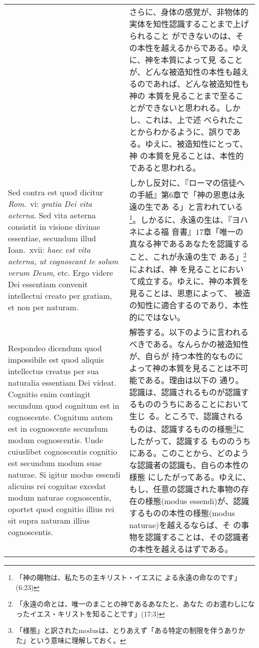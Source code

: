 \documentclass[10pt]{jsarticle} %
\begin{document}
\begin{longtable}{p{21em}p{21em}}
&

さらに、身体の感覚が、非物体的実体を知性認識することまで上げられること
ができないのは、その本性を越えるからである。ゆえに、神を本質によって見
ることが、どんな被造知性の本性も越えるのであれば、どんな被造知性も神の
本質を見ることまで至ることができないと思われる。しかし、これは、上で述
べられたことからわかるように、誤りである。ゆえに、被造知性にとって、神
の本質を見ることは、本性的であると思われる。

\\




{\sc Sed contra est} quod dicitur {\it Rom}.\ {\sc vi}: {\it gratia
Dei vita aeterna}. Sed vita aeterna consistit in visione divinae
essentiae, secundum illud Ioan.\ {\sc xvii}: {\it haec est vita
aeterna, ut cognoscant te solum verum Deum}, etc. Ergo videre Dei
essentiam convenit intellectui creato per gratiam, et non per naturam.

&

しかし反対に、『ローマの信徒への手紙』第6章で「神の恩恵は永遠の生であ
る」と言われている\footnote{「神の賜物は、私たちの主キリスト・イエスに
よる永遠の命なのです」(6:23)}。しかるに、永遠の生は、『ヨハネによる福
音書』17章「唯一の真なる神であるあなたを認識すること、これが永遠の生で
ある」\footnote{「永遠の命とは、唯一のまことの神であるあなたと、あなた
のお遣わしになったイエス・キリストを知ることです」(17:3)}によれば、神
を見ることにおいて成立する。ゆえに、神の本質を見ることは、恩恵によって、
被造の知性に適合するのであり、本性的にではない。


\\


{\sc Respondeo dicendum} quod impossibile est quod aliquis intellectus
creatus per sua naturalia essentiam Dei videat. Cognitio enim
contingit secundum quod cognitum est in cognoscente. Cognitum autem
est in cognoscente secundum modum cognoscentis. Unde cuiuslibet
cognoscentis cognitio est secundum modum suae naturae. Si igitur modus
essendi alicuius rei cognitae excedat modum naturae cognoscentis,
oportet quod cognitio illius rei sit supra naturam illius
cognoscentis.


&

解答する。以下のように言われるべきである。なんらかの被造知性が、自らが
持つ本性的なものによって神の本質を見ることは不可能である。理由は以下の
通り。認識は、認識されるものが認識するもののうちにあることにおいて生じ
る。ところで、認識されるものは、認識するものの様態\footnote{「様態」と訳されたmodusは、とりあえず「ある特定の制限を伴うありかた」という意味に理解しておく。}にしたがって、認識する
もののうちにある。このことから、どのような認識者の認識も、自らの本性の様態
にしたがってある。ゆえに、もし、任意の認識された事物の存在の様態(modus
essendi)が、認識するものの本性の様態(modus naturae)を越えるならば、そ
の事物を認識することは、その認識者の本性を越えるはずである。


\end{longtable}
\end{document}
